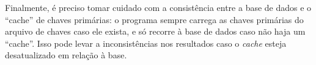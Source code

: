 \documentclass{article}
\begin{document}
Finalmente, é preciso tomar cuidado com a consistência entre a base de dados e o ``cache'' de chaves primárias: o programa sempre carrega as chaves primárias do arquivo de chaves caso ele exista, e só recorre à base de dados caso não haja um ``cache''. Isso pode levar a inconsistências nos resultados caso o \textit{cache} esteja desatualizado em relação à base.
\end{document}
